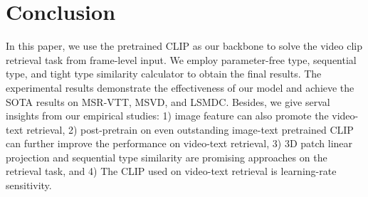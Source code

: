 \documentclass[11pt]{article}
\begin{document}
	\section{Conclusion}
	In this paper, we use the pretrained CLIP as our backbone to solve the video clip retrieval task from frame-level input. We employ parameter-free type, sequential type, and tight type similarity calculator to obtain the final results. The experimental results demonstrate the effectiveness of our model and achieve the SOTA results on MSR-VTT, MSVD, and LSMDC. Besides, we give serval insights from our empirical studies: 1) image feature can also promote the video-text retrieval, 2) post-pretrain on even outstanding image-text pretrained CLIP can further improve the performance on video-text retrieval, 3) 3D patch linear projection and sequential type similarity are promising approaches on the retrieval task, and 4) The CLIP used on video-text retrieval is learning-rate sensitivity.
	

	

	\clearpage
	\appendix
	\setcounter{table}{0}
	\renewcommand{\thetable}{A\arabic{table}}
\end{document}
